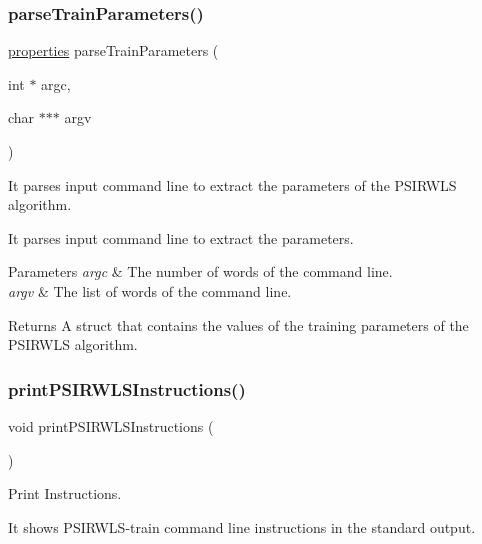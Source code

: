 \subsubsection{\texorpdfstring{parse\+Train\+Parameters()}{parseTrainParameters()}}
{\ttfamily \hyperlink{structproperties}{properties} parse\+Train\+Parameters (\begin{DoxyParamCaption}\item[{int $\ast$}]{argc,  }\item[{char $\ast$$\ast$$\ast$}]{argv }\end{DoxyParamCaption})}



It parses input command line to extract the parameters of the P\+S\+I\+R\+W\+LS algorithm. 

It parses input command line to extract the parameters. 
\begin{DoxyParams}{Parameters}
{\em argc} & The number of words of the command line. \\
\hline
{\em argv} & The list of words of the command line. \\
\hline
\end{DoxyParams}
\begin{DoxyReturn}{Returns}
A struct that contains the values of the training parameters of the P\+S\+I\+R\+W\+LS algorithm. 
\end{DoxyReturn}
\hypertarget{PSIRWLS-train_8h_af71e97e89750872ce608bffd01d2af41}{}\label{PSIRWLS-train_8h_af71e97e89750872ce608bffd01d2af41} 
\subsubsection{\texorpdfstring{print\+P\+S\+I\+R\+W\+L\+S\+Instructions()}{printPSIRWLSInstructions()}}
{\ttfamily void print\+P\+S\+I\+R\+W\+L\+S\+Instructions (\begin{DoxyParamCaption}{ }\end{DoxyParamCaption})}



Print Instructions. 

It shows P\+S\+I\+R\+W\+L\+S-\/train command line instructions in the standard output. \hypertarget{PSIRWLS-train_8h_aa6c8aa8b86b7a0647cc679408c310cd3}{}\label{PSIRWLS-train_8h_aa6c8aa8b86b7a0647cc679408c310cd3} 
